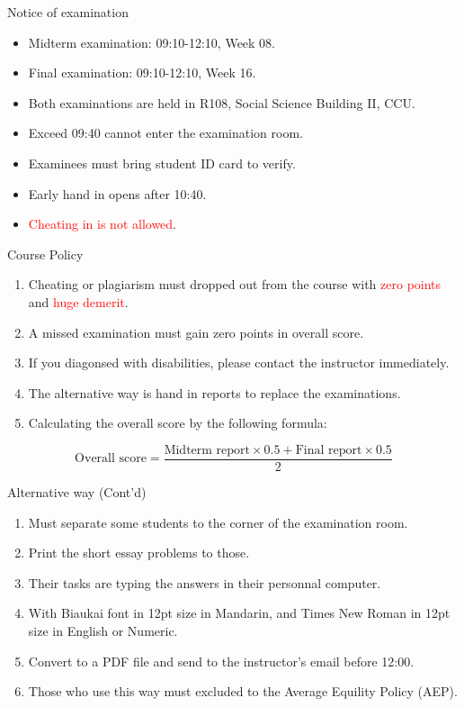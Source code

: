 \documentclass{beamer}
\begin{document}
\begin{frame}{Notice of examination}
\begin{itemize}
\item Midterm examination: 09:10-12:10, Week 08.
\item Final examination: 09:10-12:10, Week 16.
\item Both examinations are held in R108, Social Science Building II, CCU.
\item Exceed 09:40 cannot enter the examination room.
\item Examinees must bring student ID card to verify.
\item Early hand in opens after 10:40.
\item \textcolor{red}{Cheating in is not allowed}.
\end{itemize}
\end{frame}
\begin{frame}{Course Policy}
\begin{enumerate}
\item Cheating or plagiarism must dropped out from the course with \textcolor{red}{zero points} and \textcolor{red}{huge demerit}. \\
\item A missed examination must gain zero points in overall score. \\
\item If you diagonsed with disabilities, please contact the instructor immediately. \\
\item The alternative way is hand in reports to replace the examinations. \\
\item Calculating the overall score by the following formula: \\
\end{enumerate}
\begin{equation*}
\text{Overall score} = \frac{\text{Midterm report} \times 0.5 + \text{Final report} \times 0.5}{2}
\end{equation*}
\end{frame}
\begin{frame}{Alternative way (Cont'd)}
\begin{enumerate}
\item Must separate some students to the corner of the examination room. \\
\item Print the short essay problems to those. \\  
\item Their tasks are typing the answers in their personnal computer. \\
\item With Biaukai font in 12pt size in Mandarin, and Times New Roman in 12pt size in English or Numeric. \\
\item Convert to a PDF file and send to the instructor's email before 12:00. \\
\item Those who use this way must excluded to the Average Equility Policy (AEP). \\
\end{enumerate}
\end{frame}
\end{document}
